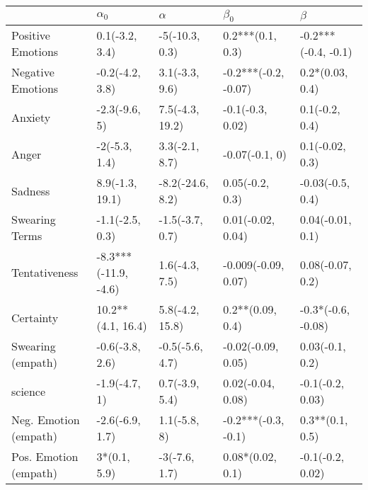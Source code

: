 \begin{tabular}{lllll}
\toprule
{} &            $\alpha_0$ &          $\alpha$ &             $\beta_0$ &              $\beta$ \\
\midrule
Positive Emotions     &        0.1(-3.2, 3.4) &    -5(-10.3, 0.3) &      0.2***(0.1, 0.3) &  -0.2***(-0.4, -0.1) \\
Negative Emotions     &       -0.2(-4.2, 3.8) &    3.1(-3.3, 9.6) &  -0.2***(-0.2, -0.07) &      0.2*(0.03, 0.4) \\
Anxiety               &         -2.3(-9.6, 5) &   7.5(-4.3, 19.2) &      -0.1(-0.3, 0.02) &       0.1(-0.2, 0.4) \\
Anger                 &         -2(-5.3, 1.4) &    3.3(-2.1, 8.7) &        -0.07(-0.1, 0) &      0.1(-0.02, 0.3) \\
Sadness               &       8.9(-1.3, 19.1) &  -8.2(-24.6, 8.2) &       0.05(-0.2, 0.3) &     -0.03(-0.5, 0.4) \\
Swearing Terms        &       -1.1(-2.5, 0.3) &   -1.5(-3.7, 0.7) &     0.01(-0.02, 0.04) &     0.04(-0.01, 0.1) \\
Tentativeness         &  -8.3***(-11.9, -4.6) &    1.6(-4.3, 7.5) &   -0.009(-0.09, 0.07) &     0.08(-0.07, 0.2) \\
Certainty             &     10.2**(4.1, 16.4) &   5.8(-4.2, 15.8) &      0.2**(0.09, 0.4) &   -0.3*(-0.6, -0.08) \\
Swearing (empath)     &       -0.6(-3.8, 2.6) &   -0.5(-5.6, 4.7) &    -0.02(-0.09, 0.05) &      0.03(-0.1, 0.2) \\
science               &         -1.9(-4.7, 1) &    0.7(-3.9, 5.4) &     0.02(-0.04, 0.08) &     -0.1(-0.2, 0.03) \\
Neg. Emotion (empath) &       -2.6(-6.9, 1.7) &      1.1(-5.8, 8) &   -0.2***(-0.3, -0.1) &      0.3**(0.1, 0.5) \\
Pos. Emotion (empath) &          3*(0.1, 5.9) &     -3(-7.6, 1.7) &      0.08*(0.02, 0.1) &     -0.1(-0.2, 0.02) \\
\bottomrule
\end{tabular}
